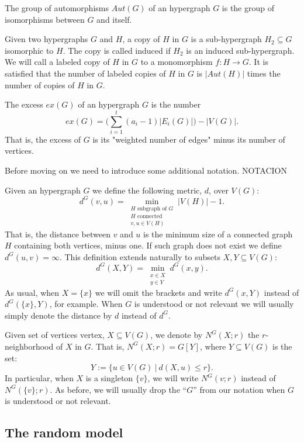 \documentclass[12pt,notitlepage,a4paper]{article}
\theoremstyle{definition}
\begin{document}
The group of automorphisms $Aut(G)$ of an hypergraph $G$ is the group
of isomorphisms between $G$ and itself. 
\par

Given two hypergraphs $G$ and $H$, a copy of $H$ in $G$ is
a sub-hypergraph $H_2\subseteq G$ isomorphic to $H$. The copy
is called induced if $H_2$ is an induced sub-hypergraph.
We will call a labeled copy
of $H$ in $G$ to a monomorphism $f:H\rightarrow G$. 
It is satisfied that the number
of labeled copies of $H$ in $G$ is $|Aut(H)|$ times the number
of copies of $H$ in $G$.


The excess $ex(G)$ of an hypergraph $G$ is the number
\[
ex(G)= \big(\sum_{i=1}^{t} (a_i-1)|E_i(G)|\big) - |V(G)|.  
\] 
That is, the excess of $G$ is its "weighted number of edges"
minus its number of vertices. \par



Before moving on we need to introduce some additional notation. NOTACION

Given an hypergraph $G$ we define the following metric, $d$, over $V(G)$:
\[ d^G(v,u)= \min_{\substack{H \text{ subgraph of } G\\ 
		H \text{ connected }\\
		v,u\in V(H)}} |V(H)| - 1 .\]
That is, the distance between $v$ and $u$ is the minimum size
of a connected graph $H$ containing both vertices, minus one. 
If such graph does not exist we define $d^G(u,v)=\infty$.
This definition extends naturally to subsets $X,Y\subseteq V(G)$:
\[ d^G(X,Y)=\min_{\substack{x\in X\\ y\in Y}} d^G(x,y).\]
As usual, when $X=\{x\}$ we will omit the brackets and write
$d^G(x,Y)$ instead of $d^G(\{x\},Y)$, for example. When $G$ 
is understood or not relevant we will usually simply denote the 
distance by $d$ instead of $d^G$. \par

Given set of vertices vertex, $X\subseteq V(G)$, 
we denote by $N^G(X;r)$ the $r$-neighborhood of $X$ in 
$G$. That is,  $N^G(X;r)= G[Y]$, where $Y\subseteq V(G)$ is 
the set:
\[ Y:= \{ u \in V(G) \ | \ d(X,u)\leq r   \}. \]
In particular, when $X$ is a singleton $\{v\}$, we
will write $N^G(v;r)$ instead of $N^G(\{v\};r)$.
As before, we will usually drop the ``$G$'' from our 
notation when $G$ is understood or not relevant.   

\subsection{The random model}
\end{document}
